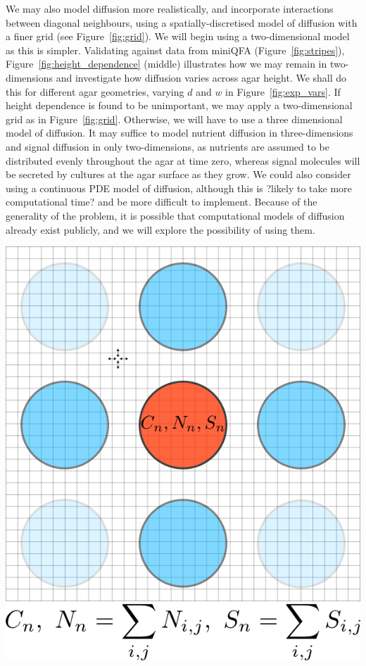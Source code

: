 We may also model diffusion more realistically, and incorporate
interactions between diagonal neighbours, using a
spatially-discretised model of diffusion with a finer grid (see
Figure~\ref{fig:grid}). We will begin using a two-dimensional model as
this is simpler. Validating against data from miniQFA
(Figure~\ref{fig:stripes}), Figure~\ref{fig:height_dependence}
(middle) illustrates how we may remain in two-dimensions and
investigate how diffusion varies across agar height. We shall do this
for different agar geometries, varying \(d\) and \(w\) in
Figure~\ref{fig:exp_vars}. If height dependence is found to be
unimportant, we may apply a two-dimensional grid as in
Figure~\ref{fig:grid}. Otherwise, we will have to use a three
dimensional model of diffusion. It may suffice to model nutrient
diffusion in three-dimensions and signal diffusion in only
two-dimensions, as nutrients are assumed to be distributed evenly
throughout the agar at time zero, whereas signal molecules will be
secreted by cultures at the agar surface as they grow. We could also
consider using a continuous PDE model of diffusion, although this is
?likely to take more computational time? and be more difficult to
implement. Because of the generality of the problem, it is
possible that computational models of diffusion already exist
publicly, and we will explore the possibility of using them.

\begin{Figure}
  \centering
  \includegraphics[width=\linewidth]{square_array_grid}
  \label{fig:grid}
\end{Figure}

